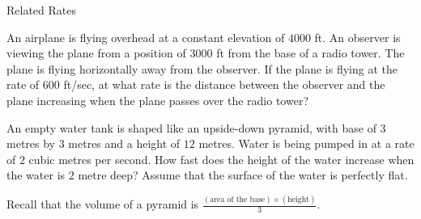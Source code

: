 \documentclass[../main.tex]{subfiles}
\begin{document}
\begin{lesson}{Related Rates}
  \clearpage
  \begin{example}
    An airplane is flying overhead at a constant elevation of \(4000\) ft. An observer is viewing the plane from a position of \(3000\) ft from the base of a radio tower. The plane is flying horizontally away from the observer. If the plane is flying at the rate of \(600\) ft/sec, at what rate is the distance between the observer and the plane increasing when the plane passes over the radio tower?

  \end{example}
  \clearpage

  \begin{example}
    An empty water tank is shaped like an upside-down pyramid, with base of \(3\) metres by \(3\) metres and a height of \(12\) metres. Water is being pumped in at a rate of \(2\) cubic metres per second. How fast does the height of the water increase when the water is \(2\) metre deep? Assume that the surface of the water is perfectly flat. 

    Recall that the volume of a pyramid is \(\frac{(\text{area of the base}) \times (\text{height})}{3}\).
  \end{example}
\end{lesson}
\end{document}
